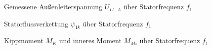 \chapter{}
\begin{figure}[h]
	\centering
	
	\caption{Gemessene Außenleiterspannung $ U_{L1,A}  $ über Statorfrequenz $ f_{1} $}
	\label{fig:6b:UL}
\end{figure}

\begin{figure}[h]
	\centering
	
	\caption{Statorflussverkettung $ \psi_{1k} $ über Statorfrequenz $ f_{1} $}
	\label{fig:6c:psi}
\end{figure}

\begin{figure}[h]
	\centering
	
	\caption{Kippmoment $ M_{K} $ und inneres Moment $ M_{Mi} $ über Statorfrequenz $ f_{1} $}
	\label{fig:6d:Momente}
\end{figure}